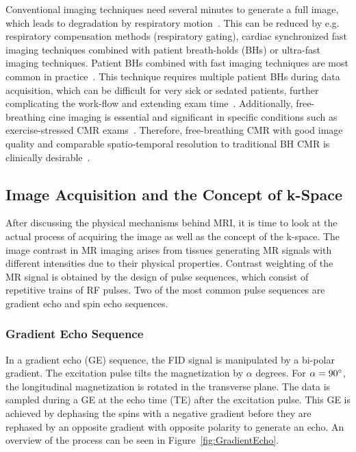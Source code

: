 \noindent Conventional imaging techniques need several minutes to generate a full image, which leads to degradation by respiratory motion~\cite{CineReview1}. This can be reduced by e.g. respiratory compensation methods (respiratory gating), cardiac synchronized fast imaging techniques combined with patient breath-holds (BHs) or ultra-fast imaging techniques. Patient BHs combined with fast imaging techniques are most common in practice~\cite{CineReview1}. This technique requires multiple patient BHs during data acquisition, which can be difficult for very sick or sedated patients, further complicating the work-flow and extending exam time~\cite{Lin2022}. Additionally, free-breathing cine imaging is essential and significant in specific conditions such as exercise-stressed CMR exams~\cite{Chew2020}. Therefore, free-breathing CMR with good image quality and comparable spatio-temporal resolution to traditional BH CMR is clinically desirable~\cite{Wang2021}. 

\subsection{Image Acquisition and the Concept of k-Space} \label{SubSec:ImageAcquisitionAndK-Space}
After discussing the physical mechanisms behind MRI, it is time to look at the actual process of acquiring the image as well as the concept of the k-space. The image contrast in MR imaging arises from tissues generating MR signals with different intensities due to their physical properties. Contrast weighting of the MR signal is obtained by the design of pulse sequences, which consist of repetitive trains of RF pulses. Two of the most common pulse sequences are gradient echo and spin echo sequences. 

\subsubsection{Gradient Echo Sequence}
In a gradient echo (GE) sequence, the FID signal is manipulated by a bi-polar gradient. The excitation pulse tilts the magnetization by $\alpha$ degrees. For $\alpha = 90\degree$, the longitudinal magnetization is rotated in the transverse plane. The data is sampled during a GE at the echo time (TE) after the excitation pulse. This GE is achieved by dephasing the spins with a negative gradient before they are rephased by an opposite gradient with opposite polarity to generate an echo. An overview of the process can be seen in Figure~\ref{fig:GradientEcho}. 

